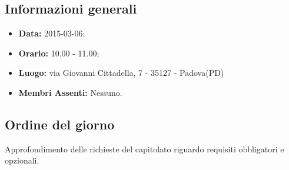 \subsection{Informazioni generali}
\begin{itemize}
	\item \textbf{Data:} 2015-03-06;
	\item \textbf{Orario:} 10.00 - 11.00;
	\item \textbf{Luogo:} via Giovanni Cittadella, 7 - 35127 - Padova(PD)
	\item \textbf{Membri Assenti:} Nessuno.
\end{itemize}

\subsection{Ordine del giorno}
Approfondimento delle richieste del capitolato riguardo requisiti obbligatori e opzionali.
